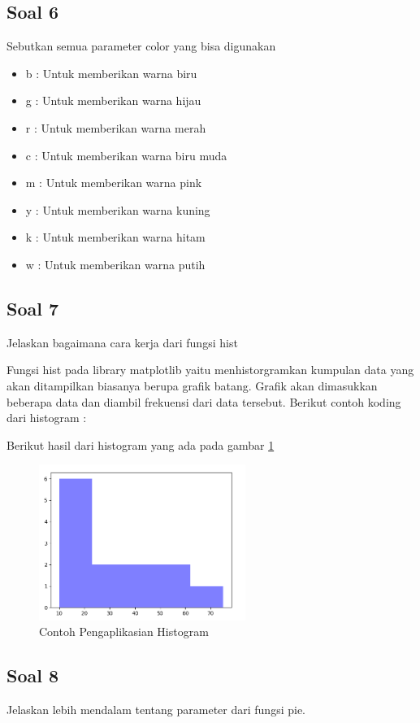 \subsection{Soal 6}
Sebutkan semua parameter color yang bisa digunakan

\begin{itemize}
	\item b : Untuk memberikan warna biru
	\item g : Untuk memberikan warna hijau
	\item r : Untuk memberikan warna merah
	\item c : Untuk memberikan warna biru muda
	\item m : Untuk memberikan warna pink
	\item y : Untuk memberikan warna kuning
	\item k : Untuk memberikan warna hitam
	\item w : Untuk memberikan warna putih
\end{itemize}

\subsection{Soal 7}
Jelaskan bagaimana cara kerja dari fungsi hist

Fungsi hist pada library matplotlib yaitu menhistorgramkan kumpulan data yang akan ditampilkan biasanya berupa grafik batang. Grafik akan dimasukkan beberapa data dan diambil frekuensi dari data tersebut. Berikut contoh koding dari histogram : 

Berikut hasil dari histogram yang ada pada gambar \ref{Contoh_Soal7}
\begin{figure} [ht]
	\centerline{\includegraphics[width=0.6\textwidth]{figures/6/1174035/Teori/Soal7.png}}
	\caption{Contoh Pengaplikasian Histogram}
	\label{Contoh_Soal7}
\end{figure}
\subsection{Soal 8}
Jelaskan lebih mendalam tentang parameter dari fungsi pie.

